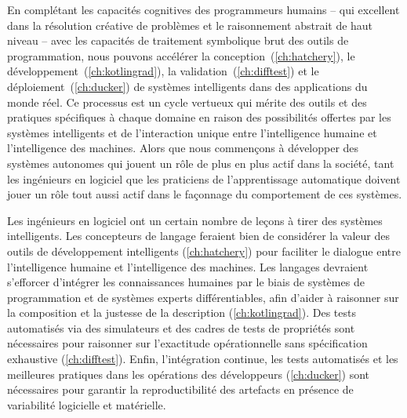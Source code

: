 En complétant les capacités cognitives des programmeurs humains -- qui excellent dans la résolution créative de problèmes et le raisonnement abstrait de haut niveau -- avec les capacités de traitement symbolique brut des outils de programmation, nous pouvons accélérer la conception~(\autoref{ch:hatchery}), le développement~(\autoref{ch:kotlingrad}), la validation~(\autoref{ch:difftest}) et le déploiement~(\autoref{ch:ducker}) de systèmes intelligents dans des applications du monde réel. Ce processus est un cycle vertueux qui mérite des outils et des pratiques spécifiques à chaque domaine en raison des possibilités offertes par les systèmes intelligents et de l'interaction unique entre l'intelligence humaine et l'intelligence des machines. Alors que nous commençons à développer des systèmes autonomes qui jouent un rôle de plus en plus actif dans la société, tant les ingénieurs en logiciel que les praticiens de l'apprentissage automatique doivent jouer un rôle tout aussi actif dans le façonnage du comportement de ces systèmes.

Les ingénieurs en logiciel ont un certain nombre de leçons à tirer des systèmes intelligents. Les concepteurs de langage feraient bien de considérer la valeur des outils de développement intelligents (\autoref{ch:hatchery}) pour faciliter le dialogue entre l'intelligence humaine et l'intelligence des machines. Les langages devraient s'efforcer d'intégrer les connaissances humaines par le biais de systèmes de programmation et de systèmes experts différentiables, afin d'aider à raisonner sur la composition et la justesse de la description (\autoref{ch:kotlingrad}). Des tests automatisés via des simulateurs et des cadres de tests de propriétés sont nécessaires pour raisonner sur l'exactitude opérationnelle sans spécification exhaustive (\autoref{ch:difftest}). Enfin, l'intégration continue, les tests automatisés et les meilleures pratiques dans les opérations des développeurs (\autoref{ch:ducker}) sont nécessaires pour garantir la reproductibilité des artefacts en présence de variabilité logicielle et matérielle.

